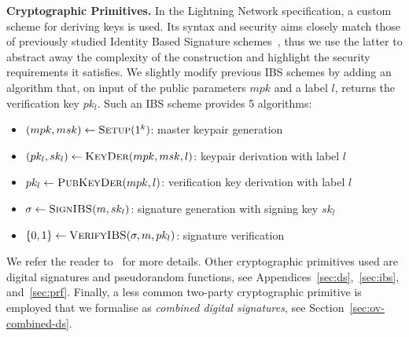   \noindent \textbf{Cryptographic Primitives.}
    In the Lightning Network specification, a custom scheme for deriving keys is
    used. Its syntax and security aims closely match those of previously studied
    Identity Based Signature schemes~\cite{ibsshamir,ibspaterson}, thus we use
    the latter to abstract away the complexity of the construction and highlight
    the security requirements it satisfies. We slightly modify previous IBS
    schemes by adding an algorithm that, on input of the public parameters $mpk$
    and a label $l$, returns the verification key $pk_l$. Such an IBS scheme
    provides 5 algorithms:
    \begin{itemize}
      \item $(mpk, msk) \leftarrow \textsc{Setup}(1^k)$: master keypair
      generation
      \item $(pk_l, sk_l) \leftarrow \textsc{KeyDer}(mpk, msk, l)$: keypair
      derivation with label $l$
      \item $pk_l \leftarrow \textsc{PubKeyDer}(mpk, l)$: verification key
      derivation with label $l$
      \item $\sigma \leftarrow \textsc{SignIBS}(m, sk_l)$: signature generation
      with signing key $sk_l$
      \item $\{0, 1\} \leftarrow \textsc{VerifyIBS}(\sigma, m, pk_l)$: signature
      verification
    \end{itemize}
    We refer the reader to~\cite{ibspaterson} for more details. Other
    cryptographic primitives used are digital signatures and pseudorandom
    functions, see Appendices~\ref{sec:ds},~\ref{sec:ibs}, and~\ref{sec:prf}.
    Finally, a less common  two-party cryptographic primitive is employed that
    we formalise as {\em  combined digital signatures}, see
    Section~\ref{sec:ov-combined-ds}.
